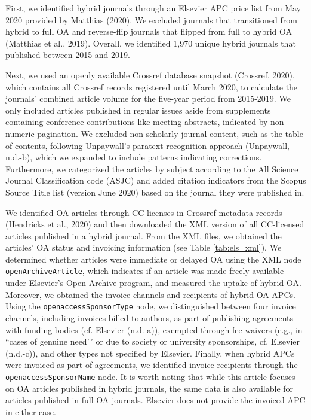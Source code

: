 \documentclass[a4paper,man,floatsintext,longtable,noextraspace,12pt]{apa6}
\begin{document}
First, we identified hybrid journals through an Elsevier APC price list
from May 2020 provided by Matthias (2020). We excluded journals that
transitioned from hybrid to full OA and reverse-flip journals that
flipped from full to hybrid OA (Matthias et al., 2019). Overall, we
identified 1,970 unique hybrid journals that published between 2015 and
2019.

Next, we used an openly available Crossref database snapshot (Crossref,
2020), which contains all Crossref records registered until March 2020,
to calculate the journals' combined article volume for the five-year
period from 2015-2019. We only included articles published in regular
issues aside from supplements containing conference contributions like
meeting abstracts, indicated by non-numeric pagination. We excluded
non-scholarly journal content, such as the table of contents, following
Unpaywall's paratext recognition approach (Unpaywall, n.d.-b), which we
expanded to include patterns indicating corrections. Furthermore, we
categorized the articles by subject according to the All Science Journal
Classification code (ASJC) and added citation indicators from the Scopus
Source Title list (version June 2020) based on the journal they were
published in.

We identified OA articles through CC licenses in Crossref metadata
records (Hendricks et al., 2020) and then downloaded the XML version of
all CC-licensed articles published in a hybrid journal. From the XML
files, we obtained the articles' OA status and invoicing information
(see Table \ref{tab:els_xml}). We determined whether articles were
immediate or delayed OA using the XML node \texttt{openArchiveArticle},
which indicates if an article was made freely available under Elsevier's
Open Archive program, and measured the uptake of hybrid OA. Moreover, we
obtained the invoice channels and recipients of hybrid OA APCs. Using
the \texttt{openaccessSponsorType} node, we distinguished between four
invoice channels, including invoices billed to authors, as part of
publishing agreements with funding bodies (cf. Elsevier (n.d.-a)),
exempted through fee waivers (e.g., in ``cases of genuine need'\,' or
due to society or university sponsorships, cf. Elsevier (n.d.-c)), and
other types not specified by Elsevier. Finally, when hybrid APCs were
invoiced as part of agreements, we identified invoice recipients through
the \texttt{openaccessSponsorName} node. It is worth noting that while
this article focuses on OA articles published in hybrid journals, the
same data is also available for articles published in full OA journals.
Elsevier does not provide the invoiced APC in either case.
\end{document}
